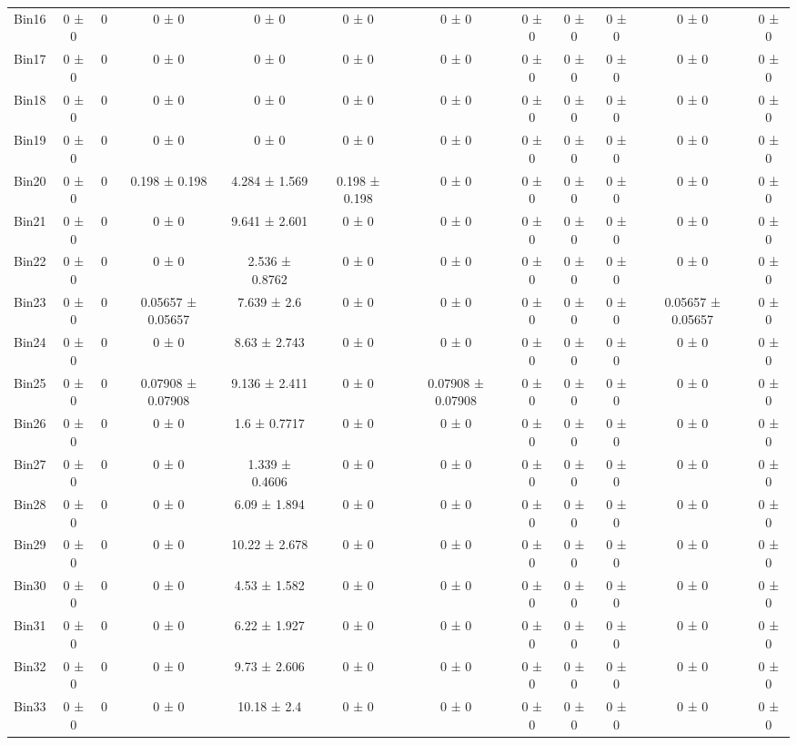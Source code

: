\begin{tabular}{@{\extracolsep{4pt}}lccccccccccc@{}}
     Bin16 & 0 ± 0 & 0 & 0 ± 0 & 0 ± 0 & 0 ± 0 & 0 ± 0 & 0 ± 0 & 0 ± 0 & 0 ± 0 & 0 ± 0 & 0 ± 0 \\ 
     Bin17 & 0 ± 0 & 0 & 0 ± 0 & 0 ± 0 & 0 ± 0 & 0 ± 0 & 0 ± 0 & 0 ± 0 & 0 ± 0 & 0 ± 0 & 0 ± 0 \\ 
     Bin18 & 0 ± 0 & 0 & 0 ± 0 & 0 ± 0 & 0 ± 0 & 0 ± 0 & 0 ± 0 & 0 ± 0 & 0 ± 0 & 0 ± 0 & 0 ± 0 \\ 
     Bin19 & 0 ± 0 & 0 & 0 ± 0 & 0 ± 0 & 0 ± 0 & 0 ± 0 & 0 ± 0 & 0 ± 0 & 0 ± 0 & 0 ± 0 & 0 ± 0 \\ 
     Bin20 & 0 ± 0 & 0 & 0.198 ± 0.198 & 4.284 ± 1.569 & 0.198 ± 0.198 & 0 ± 0 & 0 ± 0 & 0 ± 0 & 0 ± 0 & 0 ± 0 & 0 ± 0 \\ 
     Bin21 & 0 ± 0 & 0 & 0 ± 0 & 9.641 ± 2.601 & 0 ± 0 & 0 ± 0 & 0 ± 0 & 0 ± 0 & 0 ± 0 & 0 ± 0 & 0 ± 0 \\ 
     Bin22 & 0 ± 0 & 0 & 0 ± 0 & 2.536 ± 0.8762 & 0 ± 0 & 0 ± 0 & 0 ± 0 & 0 ± 0 & 0 ± 0 & 0 ± 0 & 0 ± 0 \\ 
     Bin23 & 0 ± 0 & 0 & 0.05657 ± 0.05657 & 7.639 ± 2.6 & 0 ± 0 & 0 ± 0 & 0 ± 0 & 0 ± 0 & 0 ± 0 & 0.05657 ± 0.05657 & 0 ± 0 \\ 
     Bin24 & 0 ± 0 & 0 & 0 ± 0 & 8.63 ± 2.743 & 0 ± 0 & 0 ± 0 & 0 ± 0 & 0 ± 0 & 0 ± 0 & 0 ± 0 & 0 ± 0 \\ 
     Bin25 & 0 ± 0 & 0 & 0.07908 ± 0.07908 & 9.136 ± 2.411 & 0 ± 0 & 0.07908 ± 0.07908 & 0 ± 0 & 0 ± 0 & 0 ± 0 & 0 ± 0 & 0 ± 0 \\ 
     Bin26 & 0 ± 0 & 0 & 0 ± 0 & 1.6 ± 0.7717 & 0 ± 0 & 0 ± 0 & 0 ± 0 & 0 ± 0 & 0 ± 0 & 0 ± 0 & 0 ± 0 \\ 
     Bin27 & 0 ± 0 & 0 & 0 ± 0 & 1.339 ± 0.4606 & 0 ± 0 & 0 ± 0 & 0 ± 0 & 0 ± 0 & 0 ± 0 & 0 ± 0 & 0 ± 0 \\ 
     Bin28 & 0 ± 0 & 0 & 0 ± 0 & 6.09 ± 1.894 & 0 ± 0 & 0 ± 0 & 0 ± 0 & 0 ± 0 & 0 ± 0 & 0 ± 0 & 0 ± 0 \\ 
     Bin29 & 0 ± 0 & 0 & 0 ± 0 & 10.22 ± 2.678 & 0 ± 0 & 0 ± 0 & 0 ± 0 & 0 ± 0 & 0 ± 0 & 0 ± 0 & 0 ± 0 \\ 
     Bin30 & 0 ± 0 & 0 & 0 ± 0 & 4.53 ± 1.582 & 0 ± 0 & 0 ± 0 & 0 ± 0 & 0 ± 0 & 0 ± 0 & 0 ± 0 & 0 ± 0 \\ 
     Bin31 & 0 ± 0 & 0 & 0 ± 0 & 6.22 ± 1.927 & 0 ± 0 & 0 ± 0 & 0 ± 0 & 0 ± 0 & 0 ± 0 & 0 ± 0 & 0 ± 0 \\ 
     Bin32 & 0 ± 0 & 0 & 0 ± 0 & 9.73 ± 2.606 & 0 ± 0 & 0 ± 0 & 0 ± 0 & 0 ± 0 & 0 ± 0 & 0 ± 0 & 0 ± 0 \\ 
     Bin33 & 0 ± 0 & 0 & 0 ± 0 & 10.18 ± 2.4 & 0 ± 0 & 0 ± 0 & 0 ± 0 & 0 ± 0 & 0 ± 0 & 0 ± 0 & 0 ± 0 \\ 

\end{tabular}
